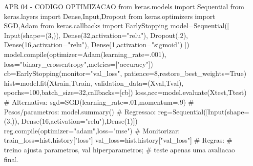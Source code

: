 APR 04 - CODIGO OPTIMIZACAO
from keras.models import Sequential
from keras.layers import Dense,Input,Dropout
from keras.optimizers import SGD,Adam
from keras.callbacks import EarlyStopping
model=Sequential([
 Input(shape=(3,)),
 Dense(32,activation="relu"),
 Dropout(.2),
 Dense(16,activation="relu"),
 Dense(1,activation="sigmoid")
])
model.compile(optimizer=Adam(learning_rate=.001),
 loss="binary_crossentropy",metrics=["accuracy"])
cb=EarlyStopping(monitor="val_loss",
 patience=8,restore_best_weights=True)
hist=model.fit(Xtrain,Ttrain,
 validation_data=(Xval,Tval),
 epochs=100,batch_size=32,callbacks=[cb])
loss,acc=model.evaluate(Xtest,Ttest)
# Alternativa:
sgd=SGD(learning_rate=.01,momentum=.9)
# Pesos/parametros:
model.summary()
# Regressao:
reg=Sequential([Input(shape=(3,)),
 Dense(16,activation="relu"),Dense(1)])
reg.compile(optimizer="adam",loss="mse")
# Monitorizar:
train_loss=hist.history["loss"]
val_loss=hist.history["val_loss"]
# Regras:
# treino ajusta parametros, val hiperparametros;
# teste apenas uma avaliacao final.